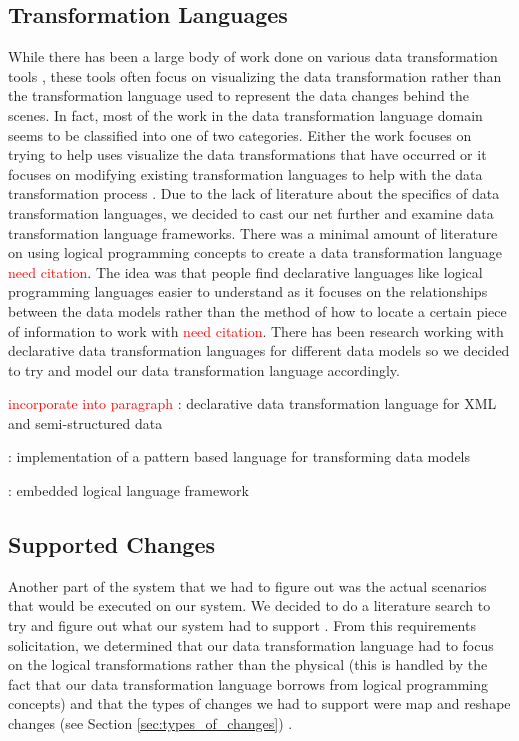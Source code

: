 \documentclass[12pt]{article}
\begin{document}
\subsection{Transformation Languages}
While there has been a large body of work done on various data transformation tools \cite{kandel2011wrangler, raman2001potter, kandel2012profiler}, these tools often focus on visualizing the data transformation rather than the transformation language used to represent the data changes behind the scenes. In fact, most of the work in the data transformation language domain seems to be classified into one of two categories. Either the work focuses on trying to help uses visualize the data transformations that have occurred \cite{kandel2011wrangler, raman2001potter, kandel2012profiler} or it focuses on modifying existing transformation languages to help with the data transformation process \cite{ilprints409, lakshmanan2001schemasql}. Due to the lack of literature about the specifics of data transformation languages, we decided to cast our net further and examine data transformation language frameworks. There was a minimal amount of literature on using logical programming concepts to create a data transformation language \textcolor{red}{need citation}. The idea was that people find declarative languages like logical programming languages easier to understand as it focuses on the relationships between the data models rather than the method of how to locate a certain piece of information to work with \textcolor{red}{need citation}. There has been research working with declarative data transformation languages for different data models \cite{bry2002towards, lawley2006practical, tarau2009embedded} so we decided to try and model our data transformation language accordingly.

\textcolor{red}{incorporate into paragraph}
\cite{bry2002towards} : declarative data transformation language for XML and semi-structured data

\cite{lawley2006practical} : implementation of a pattern based language for transforming data models

\cite{tarau2009embedded} : embedded logical language framework

\subsection{Supported Changes}
Another part of the system that we had to figure out was the actual scenarios that would be executed on our system. We decided to do a literature search to try and figure out what our system had to support \cite{galhardas:inria-00072476, kandel2011wrangler, kandel2012profiler,rahm2000data, raman2001potter}. From this requirements solicitation, we determined that our data transformation language had to focus on the logical transformations rather than the physical (this is handled by the fact that our data transformation language borrows from logical programming concepts) and that the types of changes we had to support were map and reshape changes (see Section \ref{sec:types_of_changes}) \cite{kandel2011wrangler}.
\end{document}
